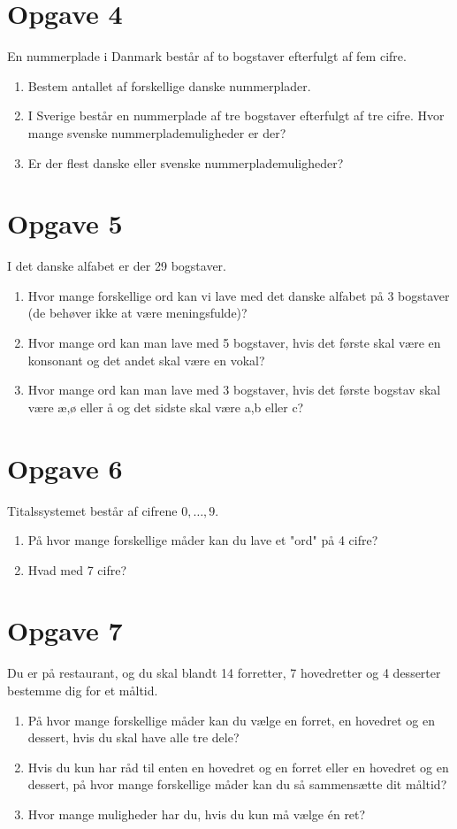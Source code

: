 \section*{Opgave 4}
En nummerplade i Danmark består af to bogstaver efterfulgt af fem cifre. 
\begin{enumerate}[label=\roman*)]
\item Bestem antallet af forskellige danske nummerplader.
\item I Sverige består en nummerplade af tre bogstaver efterfulgt af tre cifre. Hvor mange svenske nummerplademuligheder er der?
\item Er der flest danske eller svenske nummerplademuligheder?
\end{enumerate}

\section*{Opgave 5}
I det danske alfabet er der 29 bogstaver. 
\begin{enumerate}[label=\roman*)]
	\item Hvor mange forskellige ord kan vi lave med det danske alfabet på 3 bogstaver (de behøver ikke at være meningsfulde)?
	\item Hvor mange ord kan man lave med 5 bogstaver, hvis det første skal være en konsonant og det andet skal være en vokal?
	\item Hvor mange ord kan man lave med 3 bogstaver, hvis det første bogstav skal være æ,ø eller å og det sidste skal være a,b eller c?
\end{enumerate}

\section*{Opgave 6}
Titalssystemet består af cifrene $0,\hdots,9$. 
\begin{enumerate}[label=\roman*)]
	\item På hvor mange forskellige måder kan du lave et "ord" på 4 cifre?
	\item Hvad med 7 cifre?
\end{enumerate}

\section*{Opgave 7}
Du er på restaurant, og du skal blandt 14 forretter, 7 hovedretter og 4 desserter bestemme dig for et måltid. 
\begin{enumerate}[label=\roman*)]
\item På hvor mange forskellige måder kan du vælge en forret, en hovedret og en dessert, hvis du skal have alle tre dele?
\item Hvis du kun har råd til enten en hovedret og en forret eller en hovedret og en dessert, på hvor mange forskellige måder kan du så sammensætte dit måltid?
\item Hvor mange muligheder har du, hvis du kun må vælge én ret?
\end{enumerate}


